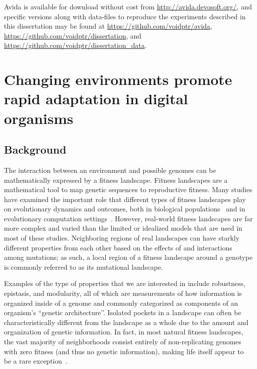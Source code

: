 \documentclass[PhD]{msu-thesis}
\begin{document}
Avida is available for download without cost from \url{http://avida.devosoft.org/}, and specific versions along with data-files to reproduce the experiments described in this dissertation may be found at \url{https://github.com/voidptr/avida}, \url{https://github.com/voidptr/dissertation}, and \url{https://github.com/voidptr/dissertation_data}.



\chapter{Changing environments promote rapid adaptation in digital organisms}
\label{chap:ce-adaptation}

\section{Background}
The interaction between an environment and possible genomes can be mathematically expressed by a fitness landscape.
Fitness landscapes are a mathematical tool to map genetic sequences to reproductive fitness. Many studies have examined the important role that different types of fitness landscapes play on evolutionary dynamics and outcomes, both in biological populations~\cite{khan_negative_2011,szendro_quantitative_2013,weinreich_darwinian_2006,nahum_tortoisehare_2015} and in evolutionary computation settings~\cite{merz_fitness_2000,humeau_paradiseo-mo:_2013,kallel_theoretical_2013}. However, real-world fitness landscapes are far more complex and varied than the limited or idealized models that are used in most of these studies. Neighboring regions of real landscapes can have starkly different properties from each other based on the effects of and interactions among mutations; as such, a local region of a fitness landscape around a genotype is commonly referred to as its mutational landscape.%

Examples of the type of properties that we are interested in include robustness, epistasis, and modularity, all of which are measurements of how information is organized inside of a genome and commonly categorized as components of an organism's ``genetic architecture''. Isolated pockets in a landscape can often be characteristically different from the landscape as a whole due to the amount and organization of genetic information. In fact, in most natural fitness landscapes, the vast majority of neighborhoods consist entirely of non-replicating genomes with zero fitness (and thus no genetic information), making life itself appear to be a rare exception~\cite{gavrilets_fitness_2004}.
\end{document}
